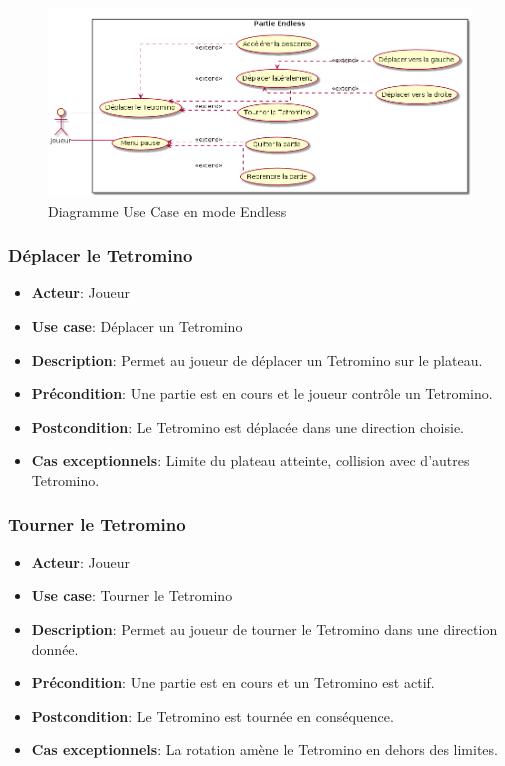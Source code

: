\documentclass{article}
\begin{document}
\begin{figure}[!h]
    \centering
    \includegraphics[width=1\textwidth]{../res/uml/usecase/EndlessUseCase.png}
    \caption{Diagramme Use Case en mode Endless}
    \label{fig:Classique}
\end{figure}

\subsubsection*{Déplacer le Tetromino}
\begin{itemize}
    \item \textbf{Acteur}: Joueur
    \item \textbf{Use case}: Déplacer un Tetromino
    \item \textbf{Description}: Permet au joueur de déplacer un Tetromino sur le plateau.
    \item \textbf{Précondition}: Une partie est en cours et le joueur contrôle un Tetromino.
    \item \textbf{Postcondition}: Le Tetromino est déplacée dans une direction choisie.
    \item \textbf{Cas exceptionnels}: Limite du plateau atteinte, collision avec d'autres Tetromino.
\end{itemize}

\subsubsection*{Tourner le Tetromino}
\begin{itemize}
    \item \textbf{Acteur}: Joueur
    \item \textbf{Use case}: Tourner le Tetromino
    \item \textbf{Description}: Permet au joueur de tourner le Tetromino dans une direction donnée.
    \item \textbf{Précondition}: Une partie est en cours et un Tetromino est actif.
    \item \textbf{Postcondition}: Le Tetromino est tournée en conséquence.
    \item \textbf{Cas exceptionnels}: La rotation amène le Tetromino en dehors des limites.
\end{itemize}
\end{document}
